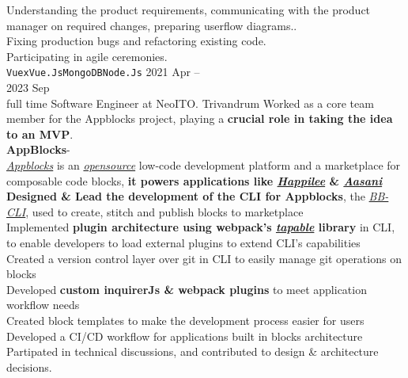 \documentclass[9pt]{developercv} %
\begin{document}
\begin{entrylist}
{			\faCaretRight\: Understanding the product requirements, communicating with the product manager on required changes, preparing userflow diagrams.. \\
			\faCaretRight\: Fixing production bugs and refactoring existing code.\\
			\faCaretRight\: Participating in agile ceremonies.\\
			\texttt{Vuex}\slashsep\texttt{Vue.Js}\slashsep\texttt{MongoDB}\slashsep\texttt{Node.Js}
		}
	\entry
		{2021 Apr -- \\ 2023 Sep \\\footnotesize{full time}}
		{Software Engineer}
		{at}
		{NeoITO.}
		{Trivandrum}
		{
			Worked as a core team member for the Appblocks project, playing a \textbf{crucial role in taking the idea to an MVP}.\smallskip\\
			\textbf{AppBlocks\texttrademark}\;-\;{\footnotesize\textcolor{darkgray}{ Low-code dev platform and marketplace.}}\\
			\href{https://www.appblocks.com/}{\emph{Appblocks}} is an \href{https://github.com/appblocks-hub}{\emph{opensource}} low-code development platform and a marketplace for composable code blocks, \textbf{it powers applications like \href{https://www.happilee.io/}{\emph{Happilee\texttrademark}} \& \href{https://www.aasanibooks.com/}{\emph{Aasani}\texttrademark}}\smallskip\\
  			\faCaretRight\: \textbf{Designed \& Lead the development of the CLI for Appblocks}, the \href{https://github.com/appblocks-hub/BB-CLI}{\emph{BB-CLI}}, used to create, stitch and publish blocks to marketplace\\
			\faCaretRight\: Implemented \textbf{plugin architecture using webpack's \href{https://github.com/webpack/tapable}{\emph{tapable}} library} in CLI, to enable developers to load external plugins to extend CLI's capabilities\\
  			\faCaretRight\: Created a version control layer over git in CLI to easily manage git operations on blocks\\
			\faCaretRight\: Developed \textbf{custom inquirerJs \& webpack plugins} to meet application workflow needs\\
			\faCaretRight\: Created block templates to make the development process easier for users\\
			\faCaretRight\: Developed a CI/CD workflow for applications built in blocks architecture\\
			\faCaretRight\: Partipated in technical discussions, and contributed to design \& architecture decisions.\\
}
\end{entrylist}
\end{document}
